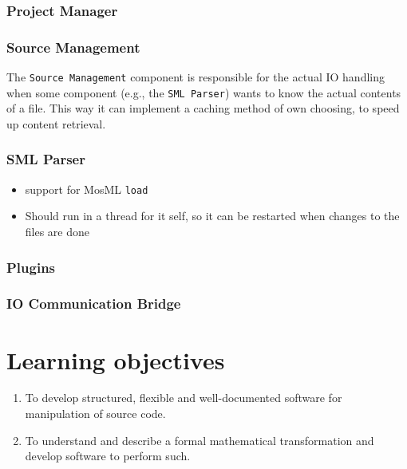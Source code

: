 \documentclass[a4paper,oneside]{memoir}
\begin{document}
\subsubsection{Project Manager}

\subsubsection{Source Management}


The \texttt{Source Management} component is responsible for the actual
IO handling when some component (e.g., the \texttt{SML Parser}) wants
to know the actual contents of a file. This way it can implement a
caching method of own choosing, to speed up content retrieval.


\subsubsection{SML Parser}
\begin{itemize}
\item support for MosML \texttt{load}

\item Should run in a thread for it self, so it can be restarted when
  changes to the files are done
\end{itemize}

\subsubsection{Plugins}


\subsubsection{IO Communication Bridge}



\section{Learning objectives}

\begin{enumerate}
\item To develop structured, flexible and well-documented software for
  manipulation of source code.
\item To understand and describe a formal mathematical transformation
  and develop software to perform such.
\end{enumerate}
\end{document}
